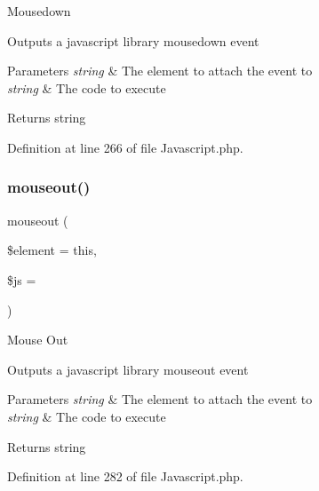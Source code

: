 Mousedown

Outputs a javascript library mousedown event


\begin{DoxyParams}{Parameters}
{\em string} & The element to attach the event to \\
\hline
{\em string} & The code to execute \\
\hline
\end{DoxyParams}
\begin{DoxyReturn}{Returns}
string 
\end{DoxyReturn}


Definition at line 266 of file Javascript.\+php.

\mbox{\label{class_c_i___javascript_ab2d069b9fbd0500e0f514e9ec5dc94e1}} 
\subsubsection{\texorpdfstring{mouseout()}{mouseout()}}
{\footnotesize\ttfamily mouseout (\begin{DoxyParamCaption}\item[{}]{\$element = {\ttfamily \textquotesingle{}this\textquotesingle{}},  }\item[{}]{\$js = {\ttfamily \textquotesingle{}\textquotesingle{}} }\end{DoxyParamCaption})}

Mouse Out

Outputs a javascript library mouseout event


\begin{DoxyParams}{Parameters}
{\em string} & The element to attach the event to \\
\hline
{\em string} & The code to execute \\
\hline
\end{DoxyParams}
\begin{DoxyReturn}{Returns}
string 
\end{DoxyReturn}


Definition at line 282 of file Javascript.\+php.

\mbox{\label{class_c_i___javascript_af54e0f954a0bb3983011578c848faf48}} 
